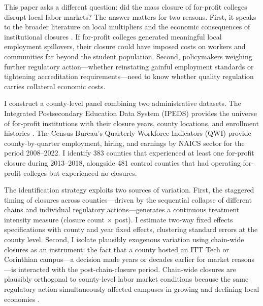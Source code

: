 \documentclass[12pt]{article}
\begin{document}
This paper asks a different question: did the mass closure of for-profit colleges disrupt local labor markets? The answer matters for two reasons. First, it speaks to the broader literature on local multipliers and the economic consequences of institutional closures \citep{moretti2010local, notowidigdo2020incidence}. If for-profit colleges generated meaningful local employment spillovers, their closure could have imposed costs on workers and communities far beyond the student population. Second, policymakers weighing further regulatory action---whether reinstating gainful employment standards or tightening accreditation requirements---need to know whether quality regulation carries collateral economic costs.

I construct a county-level panel combining two administrative datasets. The Integrated Postsecondary Education Data System (IPEDS) provides the universe of for-profit institutions with their closure years, county locations, and enrollment histories \citep{deming2012for}. The Census Bureau's Quarterly Workforce Indicators (QWI) provide county-by-quarter employment, hiring, and earnings by NAICS sector for the period 2008--2022. I identify 383 counties that experienced at least one for-profit closure during 2013--2018, alongside 481 control counties that had operating for-profit colleges but experienced no closures.

The identification strategy exploits two sources of variation. First, the staggered timing of closures across counties---driven by the sequential collapse of different chains and individual regulatory actions---generates a continuous treatment intensity measure (closure count $\times$ post). I estimate two-way fixed effects specifications with county and year fixed effects, clustering standard errors at the county level. Second, I isolate plausibly exogenous variation using chain-wide closures as an instrument: the fact that a county hosted an ITT Tech or Corinthian campus---a decision made years or decades earlier for market reasons---is interacted with the post-chain-closure period. Chain-wide closures are plausibly orthogonal to county-level labor market conditions because the same regulatory action simultaneously affected campuses in growing and declining local economies \citep{goodman2021difference}.
\end{document}
